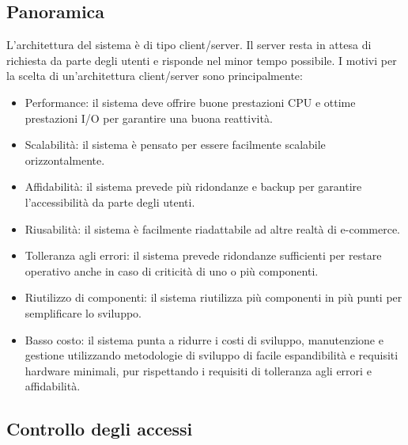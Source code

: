\documentclass[12pt,a4paper]{article}
\begin{document}
\subsection{Panoramica}
L'architettura del sistema è di tipo client/server. Il server resta in attesa di richiesta da parte degli utenti e risponde nel minor tempo possibile.
I motivi per la scelta di un'architettura client/server sono principalmente:
\begin{itemize}
\item Performance: il sistema deve offrire buone prestazioni CPU e ottime prestazioni I/O per garantire una buona reattività.
\item Scalabilità: il sistema è pensato per essere facilmente scalabile orizzontalmente.
\item Affidabilità: il sistema prevede più ridondanze e backup per garantire l'accessibilità da parte degli utenti.
\item Riusabilità: il sistema è facilmente riadattabile ad altre realtà di e-commerce.
\item Tolleranza agli errori: il sistema prevede ridondanze sufficienti per restare operativo anche in caso di criticità di uno o più componenti.
\item Riutilizzo di componenti: il sistema riutilizza più componenti in più punti per semplificare lo sviluppo.
\item Basso costo: il sistema punta a ridurre i costi di sviluppo, manutenzione e gestione utilizzando metodologie di sviluppo di facile espandibilità e requisiti hardware minimali, pur rispettando i requisiti di tolleranza agli errori e affidabilità. 
\end{itemize}

\newpage

\subsection{Controllo degli accessi}
\end{document}
